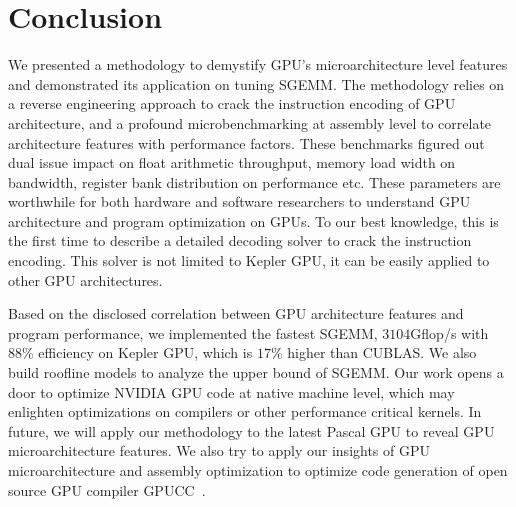 \section{Conclusion}
\label{sec:conclusion}
We presented a methodology to demystify GPU's microarchitecture level features and demonstrated its 
application on tuning SGEMM. The methodology relies on a reverse engineering approach to crack the instruction encoding 
of GPU architecture, and a profound microbenchmarking at assembly level to correlate architecture features with 
performance factors. These benchmarks figured out dual issue impact on float arithmetic throughput, memory load width on bandwidth, register 
bank distribution on performance etc. These parameters are worthwhile for both hardware and software researchers to 
understand GPU architecture and program optimization on GPUs. To our best knowledge, this is the 
first time to describe a detailed decoding solver to crack the instruction encoding. 
This solver is not limited to Kepler GPU, it can be easily applied to other GPU architectures. 

Based on the disclosed correlation between GPU architecture features and program performance, we implemented the
fastest SGEMM,  $3104$Gflop/s with $88\%$ efficiency on Kepler GPU, which is $17\%$ higher than CUBLAS. 
We also build roofline models to analyze the upper bound of SGEMM.
Our work opens a door to optimize NVIDIA GPU code at native machine level, which may enlighten optimizations on
compilers or other performance critical kernels.
In future, we will apply our methodology to the latest Pascal GPU to reveal GPU microarchitecture features.
We also try to apply our insights of GPU microarchitecture and assembly optimization to optimize code generation of open source GPU compiler
GPUCC~\cite{wu2016gpucc}.
